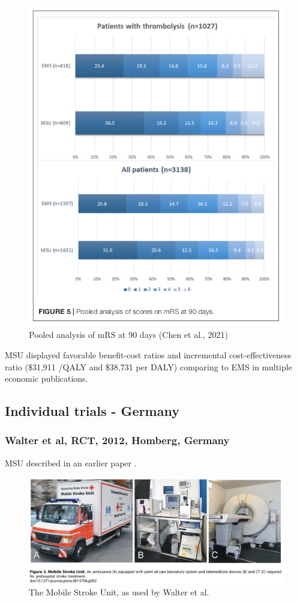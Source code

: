 \begin{figure}
    \centering
    \includegraphics[width=0.5\linewidth]{images_background/chen_fig_5}
    \caption{Pooled analysis of mRS at 90 days (Chen et al., 2021)}
    \label{fig:background_chen_fig_5}
\end{figure}

MSU displayed favorable benefit-cost ratios and incremental cost-effectiveness ratio (\$31,911 /QALY and \$38,731 per DALY) comparing to EMS in multiple economic publications.


\subsection{Individual trials - Germany}

\subsubsection{Walter et al, RCT, 2012, Homberg, Germany \cite{walter_diagnosis_2012}}

MSU described in an earlier paper \cite{walter_bringing_2010}.

\begin{figure}[ht]
    \centering
    \includegraphics[width=0.95\linewidth]{images_background/walter_msu}
    \caption{The Mobile Stroke Unit, as used by Walter et al.}
    \label{fig:walter_msu}
\end{figure}

